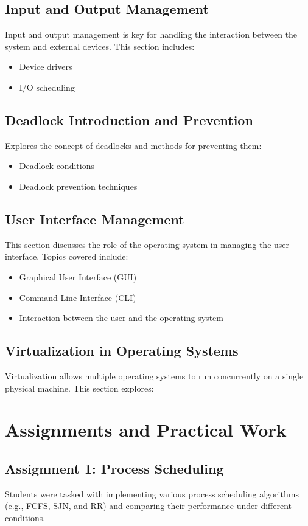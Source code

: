 \documentclass[12pt]{article}
\begin{document}
\subsection{Input and Output Management}
Input and output management is key for handling the interaction between the system and external devices. This section includes:
\begin{itemize}
    \item Device drivers
    \item I/O scheduling
\end{itemize}

\subsection{Deadlock Introduction and Prevention}
Explores the concept of deadlocks and methods for preventing them:
\begin{itemize}
    \item Deadlock conditions
    \item Deadlock prevention techniques
\end{itemize}

\subsection{User Interface Management}
This section discusses the role of the operating system in managing the user interface. Topics covered include:
\begin{itemize}
    \item Graphical User Interface (GUI)
    \item Command-Line Interface (CLI)
    \item Interaction between the user and the operating system
\end{itemize}

\subsection{Virtualization in Operating Systems}
Virtualization allows multiple operating systems to run concurrently on a single physical machine. This section explores:

\section{Assignments and Practical Work}
\subsection{Assignment 1: Process Scheduling}
Students were tasked with implementing various process scheduling algorithms (e.g., FCFS, SJN, and RR) and comparing their performance under different conditions.
\end{document}
